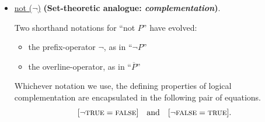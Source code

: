 \medskip

\begin{itemize}
\item
\underline{{\sc not} ($\neg$)}
{\bf (Set-theoretic analogue: {\em complementation})}.


Two shorthand notations for ``{\sc not} $P$'' have evolved:
  \begin{itemize}
  \item
the prefix-operator $\neg$, as in ``$\neg P$''
  \item
the overline-operator, as in ``$\overline{P}$''
  \end{itemize}
Whichever notation we use, the defining properties of logical
complementation are encapsulated in the following pair of equations.
\[
[\neg \mbox{\sc true} = \mbox{\sc false}] \ \ \mbox{ and } \ \ [\neg
  \mbox{\sc false} = \mbox{\sc true}].
\]
\end{itemize}

\medskip

